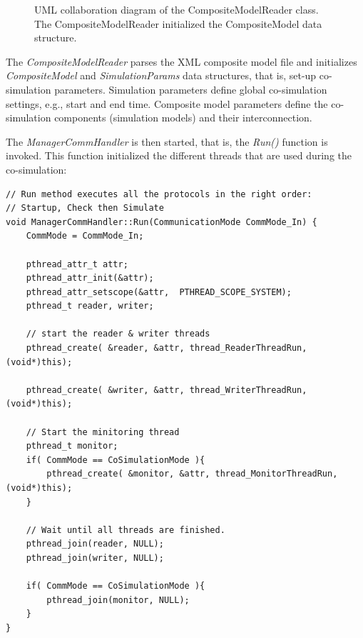 \begin{figure}[ht]
\begin{center}
\end{center}
\caption{UML collaboration diagram of the CompositeModelReader class. The
  CompositeModelReader initialized the CompositeModel data structure.}
\label{fig:CompositeModelReader}
\end{figure}

The {\em CompositeModelReader} parses the XML composite model file and initializes {\em CompositeModel} and {\em SimulationParams} data structures, that is, set-up co-simulation parameters. 
Simulation parameters define global co-simulation settings, e.g., start and end time. 
Composite model parameters define the co-simulation components (simulation models) and their interconnection.

The {\em ManagerCommHandler} is then started, that is, the {\em Run()} function is invoked. 
This function initialized the different threads that are used during the co-simulation:
{\scriptsize
\begin{verbatim}
// Run method executes all the protocols in the right order:
// Startup, Check then Simulate
void ManagerCommHandler::Run(CommunicationMode CommMode_In) {
    CommMode = CommMode_In;

    pthread_attr_t attr;
    pthread_attr_init(&attr);
    pthread_attr_setscope(&attr,  PTHREAD_SCOPE_SYSTEM);
    pthread_t reader, writer;

    // start the reader & writer threads
    pthread_create( &reader, &attr, thread_ReaderThreadRun, (void*)this);

    pthread_create( &writer, &attr, thread_WriterThreadRun, (void*)this);

    // Start the minitoring thread
    pthread_t monitor;
    if( CommMode == CoSimulationMode ){
        pthread_create( &monitor, &attr, thread_MonitorThreadRun, (void*)this);
    }

    // Wait until all threads are finished.
    pthread_join(reader, NULL);
    pthread_join(writer, NULL);

    if( CommMode == CoSimulationMode ){
        pthread_join(monitor, NULL);
    }
}
\end{verbatim}
}

